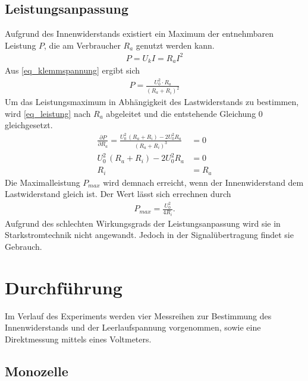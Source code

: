 \subsection{Leistungsanpassung}
Aufgrund des Innenwiderstands existiert ein Maximum der entnehmbaren Leistung $P$, die am Verbraucher $R_a$ genutzt werden kann.
\begin{align}
 P = U_k I = R_a I^2
\end{align}
Aus \eqref{eq_klemmspannung} ergibt sich
\begin{align}
 P = \frac{U^2_0\cdot R_a}{(R_a+R_i)^2}
 \label{eq_leistung}
\end{align}
Um das Leistungsmaximum in Abhängigkeit des Lastwiderstands zu bestimmen, wird \eqref{eq_leistung} nach $R_a$ abgeleitet und die 
entstehende Gleichung 0 gleichgesetzt.
\begin{align}
 \nonumber
 \frac{\partial P}{\partial R_a} = \frac{U^2_0\,(R_a+R_i)-2U^2_0R_a}{(R_a+R_i)^3}&=0\\
 \nonumber
 U^2_0\,(R_a+R_i)-2U^2_0R_a&=0\\
 R_i &= R_a
\end{align}
Die Maximalleistung $P_{max}$ wird demnach erreicht, wenn der Innenwiderstand dem Lastwiderstand gleich ist. Der Wert lässt sich errechnen
durch 
\begin{align}
 P_{max} = \frac{U^2_0}{4R_i}.
 \label{eq_maxleistung}
\end{align}
Aufgrund des schlechten Wirkungsgrads der Leistungsanpassung wird sie in Starkstromtechnik nicht angewandt. Jedoch in der Signalübertragung
findet sie Gebrauch.

\section{Durchführung}
Im Verlauf des Experiments werden vier Messreihen zur Bestimmung des Innenwiderstands und der Leerlaufspannung vorgenommen, sowie eine
Direktmessung mittels eines Voltmeters.
\subsection{Monozelle}
